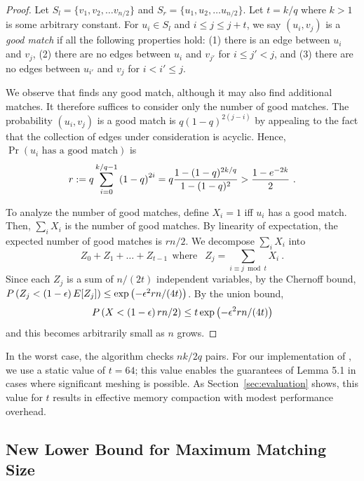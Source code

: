 \begin{proof}
Let $S_l=\{v_1, v_2, \ldots v_{n/2}\}$ and $S_r=\{u_1,
u_2, \ldots u_{n/2}\}$. Let $t=k/q$ where
$k>1$ is some arbitrary constant. For $u_i\in S_l$ and $i \leq j \leq
j+t$, we say $(u_i,v_j)$ is a \emph{good match} if all the following
properties hold: (1) there is an edge between $u_i$ and $v_j$, (2)
there are no edges between $u_i$ and $v_{j'}$ for $i\leq j'<j$, and
(3) there are no edges between $u_{i'}$ and $v_{j}$ for $i< i'\leq j$.

We observe that \sm finds any good match, although it may
also find additional matches. It therefore suffices to consider only
the number of good matches. The probability $(u_i,v_j)$ is a good
match is $q(1-q)^{2(j-i)}$ by appealing to the fact that the collection of edges under consideration is acyclic. Hence, $\Pr(u_i \mbox{ has a good match})$
is
\begin{align*}
r:= q \sum_{i=0}^{k/q-1} \left( 1-q\right) ^{2i} = q \frac{1-(1-q)^{2k/q}}{1-(1-q)^2}
 > \frac{1-e^{-2k}}{2} \ .
\end{align*}

To analyze the number of good matches, define $X_i = 1$ iff $u_i$ has
a good match. Then, $\sum_i X_i$ is the number of good matches. By
linearity of expectation, the expected number of good matches is
$rn/2$. We decompose $\sum_i X_i$ into \[Z_0+Z_1+\ldots + Z_{t-1} ~~\mbox{
  where }~~ Z_{j} = \sum_{i\equiv j \bmod t} X_i \ .\] Since each
$Z_j$ is a sum of $n/(2t)$ independent variables, by the Chernoff
bound,\\ $P\left( Z_j < \left( 1-\epsilon \right) E[Z_j]\right) \leq \exp\left( -
\epsilon^2 r n/(4t)\right)$.  By the union bound,
$$P\left( X < \left( 1-\epsilon \right) rn/2\right) \leq t \exp\left( - \epsilon^2 r
n/(4t)\right)$$ and this becomes arbitrarily small as $n$ grows.
\end{proof}

In the worst case, the algorithm checks $nk/2q$ pairs. For our
implementation of \Mesh, we use a static value of $t = 64$; this value
enables the guarantees of Lemma 5.1 in cases where significant meshing
is possible.  As Section~\ref{sec:evaluation} shows, this value for
$t$ results in effective memory compaction with modest performance
overhead.




\subsection{New Lower Bound for Maximum Matching Size}
\label{subsec:lowerbound}

